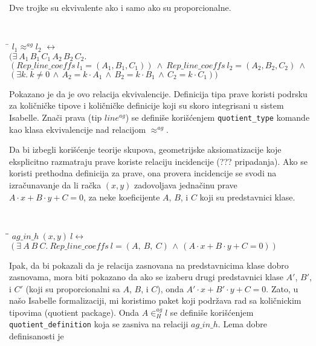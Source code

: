 \documentclass[a4paper, 12pt]{article}
\newcommand{\aginh}[2]{\ensuremath{#1 \in^{ag}_H #2}}
\begin{document}
Dve trojke su ekvivalente ako i samo ako su proporcionalne.
{\tt
\begin{tabbing}
\hspace{5mm}\=\kill
$l_1 \approx^{ag} l_2$ $\longleftrightarrow$ \\
\>  $(\exists\ A_1\,B_1\,C_1\,A_2\,B_2\,C_2.$\\
\>  $(\mathit{Rep\_line\_coeffs}\ l_1 = (A_1, B_1, C_1)) \ \wedge\ \mathit{Rep\_line\_coeffs}\ l_2 = (A_2, B_2, C_2)\ \wedge$\\
\>  $(\exists k.\ k \neq 0 \,\wedge\, A_2 = k\cdot A_1 \,\wedge\,  B_2 = k\cdot B_1\,\wedge\,C_2 = k\cdot C_1))$
\end{tabbing}
}
\noindent Pokazano je da je ovo relacija ekvivalencije. Definicija
tipa prave koristi podrsku za koli\v cni\v cke tipove i koli\v cni\v
cke definicije koji su skoro integrisani u sistem {\lat
  Isabelle\HOL}. Zna\v ci prava (tip $\mathit{line^{ag}}$) se defini\v
se kori\v s\'cenjem \verb|quotient_type| komande kao klasa
ekvivalencije nad relacijom $\approx^{ag}$.

Da bi izbegli kori\v s\'cenje teorije skupova, geometrijske
aksiomatizacije koje eksplicitno razmatraju prave koriste relaciju
incidencije (??? pripadanja). Ako se koristi prethodna definicija za
prave, ona provera incidencije se svodi na izra\v cunavanje da li ra\v
cka $(x, y)$ zadovoljava jedna\v cinu prave $A\cdot x + B\cdot y + C =
0$, za neke koeficijente $A$, $B$, i $C$ koji su predstavnici klase.

 {\tt
\begin{tabbing}
\hspace{5mm}\=\hspace{5mm}\=\kill
$ag\_in\_h\ (x, y)\ l \longleftrightarrow$\\
\>$(\exists\ A\ B\ C.\ \mathit{Rep\_line\_coeffs}\ l = (A,\ B,\ C) \,\wedge\,  (A\cdot x + B\cdot y + C = 0))$
\end{tabbing}
}

Ipak, da bi pokazali da je relacija zasnovana na predstavnicima klase
dobro zasnovama, mora biti pokazano da ako se izaberu drugi
predstavnici klase $A'$, $B'$, i $C'$ (koji su proporcionalni sa $A$,
$B$, i $C$), onda $A'\cdot x + B'\cdot y + C = 0$. Zato, u na\v so
{\lat Isabelle\HOL} formalizaciji, mi koristimo paket koji podr\v zava
rad sa koli\v cnickim tipovima ({\lat quotient package}). Onda
$\aginh{A}{l}$ se defini\v se kori\v s\'cenjem
\verb|quotient_definition| koja se zasniva na relaciji
$ag\_in\_h$. Lema dobre definisanosti je
\end{document}
